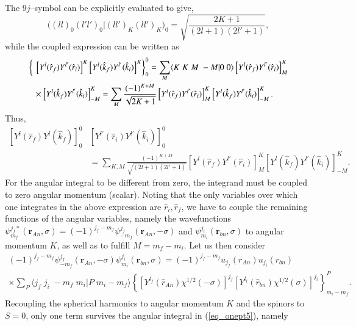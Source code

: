 The $9j$--symbol can be explicitly evaluated to give,
\begin{equation}\label{eq_onept9}
\bigl((l l)_0(l' l')_0|(l l')_K(l l')_K\bigr)_0=\sqrt{\frac{2K+1}{(2l+1)(2l'+1)}},
\end{equation}
while the coupled expression can be written as
\begin{equation}\label{eq_onept10}
    \begin{split}
\left\{\vphantom{\left[ Y^{l} (\hat r_f) Y^{l'} (\hat r_i)\right]^K}\right.&\left.\left[ Y^{l} (\hat r_f) Y^{l'} (\hat r_i)\right]^K\left[ Y^{l} (\hat k_f) Y^{l'} (\hat k_i)\right]^K\right\}^0_0=\sum_M \langle K\;K\;M\;-M|0\;0\rangle
 \left[ Y^{l} (\hat r_f) Y^{l'} (\hat r_i)\right]^K_M\\
 &\times\left[ Y^{l} (\hat k_f) Y^{l'} (\hat k_i)\right]^K_{-M}=\sum_M\frac{(-1)^{K+M}}{\sqrt{2K+1}}\left[ Y^{l} (\hat r_f) Y^{l'} (\hat r_i)\right]^K_M
\left[ Y^{l} (\hat k_f) Y^{l'} (\hat k_i)\right]^K_{-M}.
    \end{split}
\end{equation}
Thus,
\begin{equation}\label{eq_onept11}
    \begin{split}
\left[ Y^{l} (\hat r_f) Y^{l} (\hat k_f)\right]^0_0&\left[ Y^{l'} (\hat r_i) Y^{l'} (\hat k_i)\right]^0_0\\
&=\sum_{K,M}\frac{(-1)^{K+M}}{\sqrt{(2l+1)(2l'+1)}}\left[ Y^{l} (\hat r_f) Y^{l'} (\hat r_i)\right]^K_M
\left[ Y^{l} (\hat k_f) Y^{l'} (\hat k_i)\right]^K_{-M}.
    \end{split}
\end{equation}
For the angular integral to be different from zero, the integrand must be coupled to zero angular momentum (scalar). Noting that the only  variables over which one integrates in the above expression  are $\hat r_i,\hat r_f$, we have to couple the remaining functions of the angular variables, namely the wavefunctions  $\psi_{m_f}^{j_f*}(\mathbf{r}_{An},\sigma)=(-1)^{j_f-m_f}\psi_{-m_f}^{j_f}(\mathbf{r}_{An},-\sigma)$ and $\psi_{m_i}^{j_i}(\mathbf{r}_{bn},\sigma)$ to angular momentum $K$, as well as to fulfill $M=m_f-m_i$. Let us then consider
\begin{multline}\label{eq_onept35}
(-1)^{j_f-m_f}\psi_{-m_f}^{j_f}(\mathbf{r}_{An},-\sigma)\psi_{m_i}^{j_i}(\mathbf{r}_{bn},\sigma)=
(-1)^{j_f-m_f}u_{j_f}(r_{An})u_{j_i}(r_{bn})\\
\times \sum_P \langle j_f\;j_i\;-m_f\;m_i|P\;m_i-m_f\rangle \left\{\left[ Y^{l_f}(\hat r_{An}) \chi^{1/2}(-\sigma)\right]^{j_f}\left[ Y^{l_i}(\hat r_{bn}) \chi^{1/2}(\sigma)\right]^{j_i}\right\}^P_{m_i-m_f}.
\end{multline}
Recoupling the spherical harmonics to angular momentum $K$ and the spinors to $S=0$, only one term survives the angular integral in (\ref{eq_onept5}), namely

